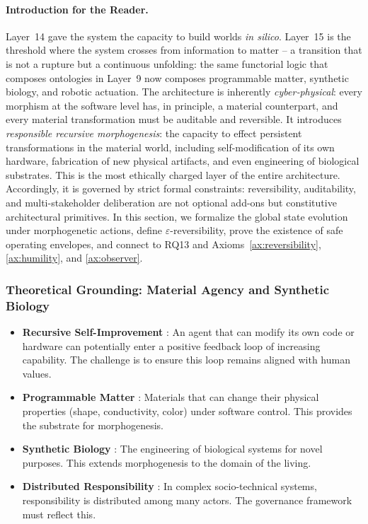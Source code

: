 \paragraph{Introduction for the Reader.}
Layer~14 gave the system the capacity to build worlds \emph{in silico}. Layer~15 is the threshold where the system crosses from information to matter – a transition that is not a rupture but a continuous unfolding: the same functorial logic that composes ontologies in Layer~9 now composes programmable matter, synthetic biology, and robotic actuation. The architecture is inherently \emph{cyber‑physical}: every morphism at the software level has, in principle, a material counterpart, and every material transformation must be auditable and reversible. It introduces \emph{responsible recursive morphogenesis}: the capacity to effect persistent transformations in the material world, including self-modification of its own hardware, fabrication of new physical artifacts, and even engineering of biological substrates. This is the most ethically charged layer of the entire architecture. Accordingly, it is governed by strict formal constraints: reversibility, auditability, and multi-stakeholder deliberation are not optional add-ons but constitutive architectural primitives. In this section, we formalize the global state evolution under morphogenetic actions, define $\varepsilon$-reversibility, prove the existence of safe operating envelopes, and connect to RQ13 and Axioms~\ref{ax:reversibility}, \ref{ax:humility}, and \ref{ax:observer}.

\subsubsection{Theoretical Grounding: Material Agency and Synthetic Biology}
\begin{itemize}
    \item \textbf{Recursive Self-Improvement} \cite{schmidhuber2007}: An agent that can modify its own code or hardware can potentially enter a positive feedback loop of increasing capability. The challenge is to ensure this loop remains aligned with human values.
    \item \textbf{Programmable Matter} \cite{goldstein2005}: Materials that can change their physical properties (shape, conductivity, color) under software control. This provides the substrate for morphogenesis.
    \item \textbf{Synthetic Biology} \cite{church2014}: The engineering of biological systems for novel purposes. This extends morphogenesis to the domain of the living.
    \item \textbf{Distributed Responsibility} \cite{floridi2004}: In complex socio-technical systems, responsibility is distributed among many actors. The governance framework must reflect this.
\end{itemize}

